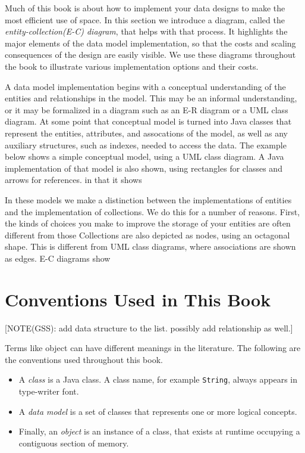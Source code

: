 Much of this book is about how to implement your data designs to make the most
efficient use of space. In this section we introduce a diagram, called the
\emph{entity-collection(E-C) diagram}, that helps with that process. It
highlights the major elements of the data model implementation, so that the
costs and scaling consequences of the design are easily visible. We use these
diagrams throughout the book to illustrate various implementation options and
their costs.

A data model implementation begins with a conceptual understanding of the
entities and relationships in the model.  This may be an informal understanding,
or it may be formalized in a diagram such as an E-R diagram or a UML class
diagram.  At some point that conceptual model is turned into Java classes that
represent the entities, attributes, and assocations of the model, as well as any
auxiliary structures, such as indexes, needed to access the data.  The example
below shows a simple conceptual model, using a UML class diagram.  A Java
implementation of that model is also shown, using rectangles for classes and
arrows for references.  %
in that it shows


In these models we make a distinction between the implementations of entities
and the implementation of collections.  We do this for a number of reasons. 
First, the kinds of choices you make to improve the storage of your entities are
often different from those Collections are also depicted as nodes, using an
octagonal shape.  This is different from UML class diagrams, where associations
are shown as edges. E-C diagrams show


\section{Conventions Used in This Book}

[NOTE(GSS): add data structure to the list.  possibly add relationship as well.]

Terms like object can have different meanings in the literature.  The following are the conventions used throughout this book.

\begin{itemize}
\item A \textit{class} is a Java class. A class name, for example \texttt{String}, always appears in type-writer font. 
\item A \textit{data model} is a set of classes that represents one or more logical concepts.
\item Finally, an \textit{object} is an instance of a class, that exists at runtime occupying a contiguous section of memory.
\end{itemize} 







 

